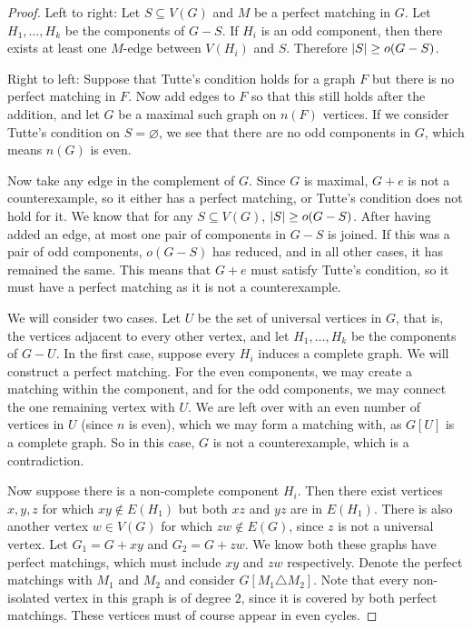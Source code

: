 \begin{proof}
  Left to right: Let $S \subseteq V(G)$ and $M$ be a perfect matching in $G$.
  Let $H_1, \ldots, H_k$ be the components of $G - S$.
  If $H_i$ is an odd component, then there exists at least one $M$-edge between
  $V(H_i)$ and $S$.
  Therefore $\left| S \right| \ge o(G-S)$.

  Right to left:
  Suppose that Tutte's condition holds for a graph $F$ but there is no perfect
  matching in $F$.
  Now add edges to $F$ so that this still holds after the addition, and let $G$
  be a maximal such graph on $n(F)$ vertices.
  If we consider Tutte's condition on $S = \varnothing$, we see that there are
  no odd components in $G$, which means $n(G)$ is even.

  Now take any edge in the complement of $G$.
  Since $G$ is maximal, $G+e$ is not a counterexample, so it either has a
  perfect matching, or Tutte's condition does not hold for it.
  We know that for any $S \subseteq V(G)$, $\left| S \right| \ge o(G-S)$.
  After having added an edge, at most one pair of components in $G-S$ is joined.
  If this was a pair of odd components, $o(G-S)$ has reduced, and in all other
  cases, it has remained the same.
  This means that $G+e$ must satisfy Tutte's condition, so it must have a
  perfect matching as it is not a counterexample.

  We will consider two cases.
  Let $U$ be the set of universal vertices in $G$, that is, the vertices
  adjacent to every other vertex, and let $H_1, \ldots, H_k$ be the components
  of $G - U$.
  In the first case, suppose every $H_i$ induces a complete graph.
  We will construct a perfect matching.
  For the even components, we may create a matching within the component, and
  for the odd components, we may connect the one remaining vertex with $U$.
  We are left over with an even number of vertices in $U$ (since $n$ is even),
  which we may form a matching with, as $G[U]$ is a complete graph.
  So in this case, $G$ is not a counterexample, which is a contradiction.

  Now suppose there is a non-complete component $H_i$.
  Then there exist vertices $x, y, z$ for which $xy \notin E(H_1)$ but both $xz$
  and $yz$ are in $E(H_1)$.
  There is also another vertex $w \in V(G)$ for which $zw \notin E(G)$, since
  $z$ is not a universal vertex.
  Let $G_1 = G + xy$ and $G_2 = G + zw$.
  We know both these graphs have perfect matchings, which must include $xy$ and
  $zw$ respectively.
  Denote the perfect matchings with $M_1$ and $M_2$ and consider $G[M_1
  \triangle M_2]$.
  Note that every non-isolated vertex in this graph is of degree $2$, since it
  is covered by both perfect matchings.
  These vertices must of course appear in even cycles.


\end{proof}
